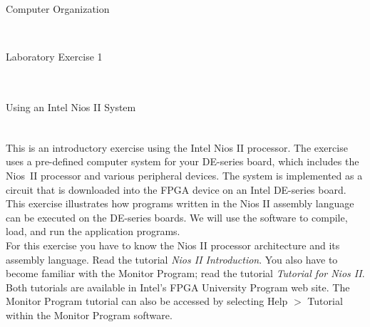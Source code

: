 \documentclass[epsfig,10pt,fullpage]{article}
\newcommand{\LabNum}{1}
\begin{document}
\centerline{\huge Computer Organization}
~\\
\centerline{\huge Laboratory Exercise \LabNum}
~\\
\centerline{\large Using an Intel\textsuperscript{\textregistered} Nios\textsuperscript{\textregistered} II System}
~\\

This is an introductory exercise using the Intel\textsuperscript{\textregistered} Nios\textsuperscript{\textregistered} II processor.  The exercise uses 
a pre-defined computer system for your DE-series board, which includes the Nios~II
processor and various peripheral devices. The system is 
implemented as a circuit that is downloaded into the FPGA device on an Intel DE-series board.
This exercise illustrates how programs written in the Nios II assembly language 
can be executed on the DE-series boards. We will use the {\it \productNameMed{}}
software to compile, load, and run the application programs. 
~\\

For this exercise you have to know the Nios II processor architecture and its assembly language.
Read the tutorial {\it Nios II Introduction}. You also have to become familiar with the 
Monitor Program; read the tutorial {\it \productNameMed{} Tutorial for Nios II}.  Both 
tutorials are available in Intel's FPGA University Program web site.  The Monitor Program tutorial 
can also be accessed by selecting {\sf Help $>$ Tutorial} within the Monitor Program software.
\end{document}
